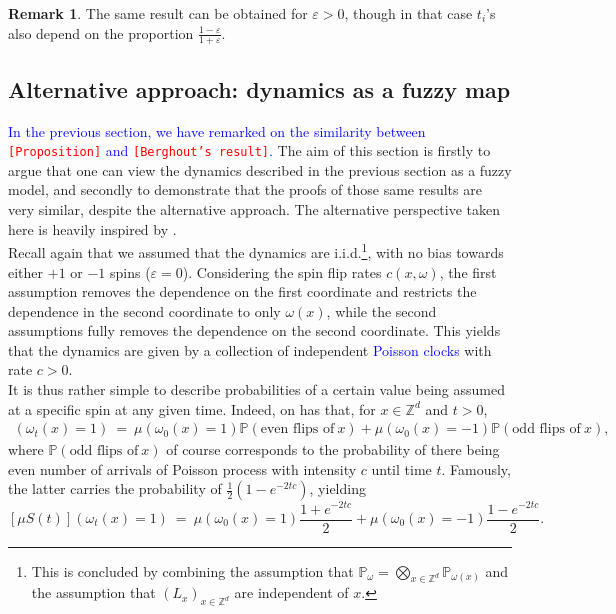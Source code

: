 \documentclass[12pt]{article}
\renewcommand{\P}{\mathbb{P}}
\newcommand{\Z}{\mathbb{Z}}
\newcommand{\1}{\mathbbm{1}}
\newcommand{\5}{\vspace{0.5cm}}
\theoremstyle{definition}
\newtheorem{rem}[thm]{Remark}
\begin{document}
\begin{rem}
The same result can be obtained for $\varepsilon>0$, though in that case $t_i$'s also depend on the proportion $\frac{1-\varepsilon}{1+\varepsilon}$.
\end{rem}


\subsection{Alternative approach: dynamics as a fuzzy map}

\textcolor{blue}{In the previous section, we have remarked on the similarity between \textcolor{red}{\texttt{[Proposition]}} and \textcolor{red}{\texttt{[Berghout's result]}}.} The aim of this section is firstly to argue that one can view the dynamics described in the previous section as a fuzzy model, and secondly to demonstrate that the proofs of those same results are very similar, despite the alternative approach. The alternative perspective taken here is heavily inspired by \cite{Ver}. \\

Recall again that we assumed that the dynamics are i.i.d.\footnote{This is concluded by combining the assumption that $\P_\omega=\bigotimes_{x\in\Z^d}\P_{\omega(x)}$ and the assumption that $(L_x)_{x\in\Z^d}$ are independent of $x$.}, with no bias towards either $+1$ or $-1$ spins ($\varepsilon=0$). Considering the spin flip rates $c(x,\omega)$, the first assumption removes the dependence on the first coordinate and restricts the dependence in the second coordinate to only $\omega(x)$, while the second assumptions fully removes the dependence on the second coordinate. This yields that the dynamics are given by a collection of independent \textcolor{blue}{Poisson clocks} with rate $c>0$. \\

It is thus rather simple to describe probabilities of a certain value being assumed at a specific spin at any given time. Indeed, on has that, for $x\in\Z^d$ and $t>0$,
\begin{align*}
[\mu S(t)](\omega_t(x)=1) ~=~ \mu(\omega_0(x)=1)\P(\text{even flips of}~x) + \mu(\omega_0(x)=-1)\P(\text{odd flips of}~x),
\end{align*}
where $\P(\text{odd flips of}~x)$ of course corresponds to the probability of there being even number of arrivals of Poisson process with intensity $c$ until time $t$. Famously, the latter carries the probability of $\frac{1}{2}(1-e^{-2tc})$, yielding
$$[\mu S(t)](\omega_t(x)=1) ~=~ \mu(\omega_0(x)=1)\frac{1+e^{-2tc}}{2} + \mu(\omega_0(x)=-1)\frac{1-e^{-2tc}}{2}.$$
\end{document}
